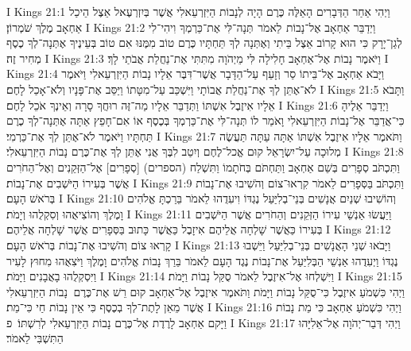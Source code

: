 I Kings 21:1	וַיְהִי אַחַר הַדְּבָרִים הָאֵלֶּה כֶּרֶם הָיָה לְנָבוֹת הַיִּזְרְעֵאלִי אֲשֶׁר בְּיִזְרְעֶאל אֵצֶל הֵיכַל אַחְאָב מֶלֶךְ שֹׁמְרוֹן׃
I Kings 21:2	וַיְדַבֵּר אַחְאָב אֶל־נָבוֹת  לֵאמֹר  תְּנָה־לִּי אֶת־כַּרְמְךָ וִיהִי־לִי לְגַן־יָרָק כִּי הוּא קָרוֹב אֵצֶל בֵּיתִי וְאֶתְּנָה לְךָ תַּחְתָּיו כֶּרֶם טוֹב מִמֶּנּוּ אִם טוֹב בְּעֵינֶיךָ אֶתְּנָה־לְךָ כֶסֶף מְחִיר זֶה׃
I Kings 21:3	וַיֹּאמֶר נָבוֹת אֶל־אַחְאָב חָלִילָה לִּי מֵיְהֹוָה מִתִּתִּי אֶת־נַחֲלַת אֲבֹתַי לָךְ׃
I Kings 21:4	וַיָּבֹא אַחְאָב אֶל־בֵּיתוֹ סַר וְזָעֵף עַל־הַדָּבָר אֲשֶׁר־דִּבֶּר אֵלָיו נָבוֹת הַיִּזְרְעֵאלִי וַיֹּאמֶר לֹא־אֶתֵּן לְךָ אֶת־נַחֲלַת אֲבוֹתָי וַיִּשְׁכַּב עַל־מִטָּתוֹ וַיַּסֵּב אֶת־פָּנָיו וְלֹא־אָכַל לָחֶם׃
I Kings 21:5	וַתָּבֹא אֵלָיו אִיזֶבֶל אִשְׁתּוֹ וַתְּדַבֵּר אֵלָיו מַה־זֶּה רוּחֲךָ סָרָה וְאֵינְךָ אֹכֵל לָחֶם׃
I Kings 21:6	וַיְדַבֵּר אֵלֶיהָ כִּי־אֲדַבֵּר אֶל־נָבוֹת הַיִּזְרְעֵאלִי וָאֹמַר לוֹ תְּנָה־לִּי אֶת־כַּרְמְךָ בְּכֶסֶף אוֹ אִם־חָפֵץ אַתָּה אֶתְּנָה־לְךָ כֶרֶם תַּחְתָּיו וַיֹּאמֶר לֹא־אֶתֵּן לְךָ אֶת־כַּרְמִי׃
I Kings 21:7	וַתֹּאמֶר אֵלָיו אִיזֶבֶל אִשְׁתּוֹ אַתָּה עַתָּה תַּעֲשֶׂה מְלוּכָה עַל־יִשְׂרָאֵל קוּם אֱכל־לֶחֶם וְיִטַב לִבֶּךָ אֲנִי אֶתֵּן לְךָ אֶת־כֶּרֶם נָבוֹת הַיִּזְרְעֵאלִי׃
I Kings 21:8	וַתִּכְתֹּב סְפָרִים בְּשֵׁם אַחְאָב וַתַּחְתֹּם בְּחֹתָמוֹ וַתִּשְׁלַח (הספרים) [סְפָרִים] אֶל־הַזְּקֵנִים וְאֶל־הַחֹרִים אֲשֶׁר בְּעִירוֹ הַיֹּשְׁבִים אֶת־נָבוֹת׃
I Kings 21:9	וַתִּכְתֹּב בַּסְּפָרִים לֵאמֹר קִרְאוּ־צוֹם וְהֹשִׁיבוּ אֶת־נָבוֹת בְּרֹאשׁ הָעָם׃
I Kings 21:10	וְהוֹשִׁיבוּ שְׁנַיִם אֲנָשִׁים בְּנֵי־בְלִיַּעַל נֶגְדּוֹ וִיעִדֻהוּ לֵאמֹר בֵּרַכְתָּ אֱלֹהִים וָמֶלֶךְ וְהוֹצִיאֻהוּ וְסִקְלֻהוּ וְיָמֹת׃
I Kings 21:11	וַיַּעֲשׂוּ אַנְשֵׁי עִירוֹ הַזְּקֵנִים וְהַחֹרִים אֲשֶׁר הַיֹּשְׁבִים בְּעִירוֹ כַּאֲשֶׁר שָׁלְחָה אֲלֵיהֶם אִיזָבֶל כַּאֲשֶׁר כָּתוּב בַּסְּפָרִים אֲשֶׁר שָׁלְחָה אֲלֵיהֶם׃
I Kings 21:12	קָרְאוּ צוֹם וְהֹשִׁיבוּ אֶת־נָבוֹת בְּרֹאשׁ הָעָם׃
I Kings 21:13	וַיָּבֹאוּ שְׁנֵי הָאֲנָשִׁים בְּנֵי־בְלִיַּעַל וַיֵּשְׁבוּ נֶגְדּוֹ וַיְעִדֻהוּ אַנְשֵׁי הַבְּלִיַּעַל אֶת־נָבוֹת נֶגֶד הָעָם לֵאמֹר בֵּרַךְ נָבוֹת אֱלֹהִים וָמֶלֶךְ וַיֹּצִאֻהוּ מִחוּץ לָעִיר וַיִּסְקְלֻהוּ בָאֲבָנִים וַיָּמֹת׃
I Kings 21:14	וַיִּשְׁלְחוּ אֶל־אִיזֶבֶל לֵאמֹר סֻקַּל נָבוֹת וַיָּמֹת׃
I Kings 21:15	וַיְהִי כִּשְׁמֹעַ אִיזֶבֶל כִּי־סֻקַּל נָבוֹת וַיָּמֹת וַתֹּאמֶר אִיזֶבֶל אֶל־אַחְאָב קוּם רֵשׁ אֶת־כֶּרֶם  נָבוֹת הַיִּזְרְעֵאלִי אֲשֶׁר מֵאֵן לָתֶת־לְךָ בְכֶסֶף כִּי אֵין נָבוֹת חַי כִּי־מֵת׃
I Kings 21:16	וַיְהִי כִּשְׁמֹעַ אַחְאָב כִּי מֵת נָבוֹת וַיָּקם אַחְאָב לָרֶדֶת אֶל־כֶּרֶם נָבוֹת הַיִּזְרְעֵאלִי לְרִשְׁתּוֹ׃ {פ}
I Kings 21:17	וַיְהִי דְּבַר־יְהֹוָה אֶל־אֵלִיָּהוּ הַתִּשְׁבִּי לֵאמֹר׃
